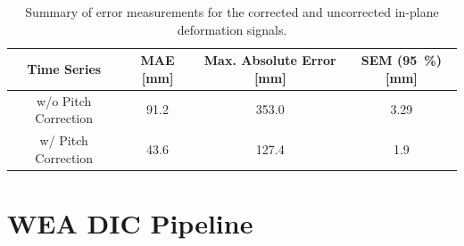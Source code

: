 \documentclass[12pt, a4paper, bibliography=totoc]{scrarticle}
\begin{document}
	\begin{table}[h!]
		\centering
		\begin{tabular}{cccc}
			\toprule
			Time Series & MAE [\unit{\milli\meter}] & Max. Absolute Error [\unit{\milli\meter}] & SEM (\qty{95}{\percent}) [\unit{\milli\meter}]\\
			\midrule
			w/o Pitch Correction & \qty{91.2}{} & \qty{353.0}{} & \qty{3.29}{} \\
			w/ Pitch Correction & \qty{43.6}{} & \qty{127.4}{} & \qty{1.9}{} \\
			\bottomrule
		\end{tabular}
		\caption{Summary of error measurements for the corrected and uncorrected in-plane deformation signals.}
		\label{tab:error_sum}
	\end{table}
	
	\FloatBarrier
	\printbibliography[title=References]
	
	
	\clearpage
	\appendix
	\section{WEA DIC Pipeline}
	\label{appendix:a}
	
\end{document}
